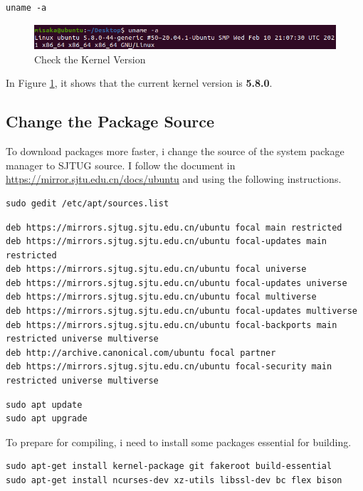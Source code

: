 \documentclass[UTF8,10pt,a4paper]{article}
\theoremstyle{Problem}
\theoremstyle{Solution}
\begin{document}
\begin{lstlisting}
uname -a
\end{lstlisting}

\begin{figure}[H]
    \centering
    \includegraphics[width=380pt]{3.png}
    \caption{Check the Kernel Version}
    \label{3}
\end{figure}

In Figure \ref{3}, it shows that the current kernel version is \textbf{5.8.0}.

\subsection{Change the Package Source}
To download packages more faster, i change the source of the system package manager to SJTUG source. I follow the document in \underline{https://mirror.sjtu.edu.cn/docs/ubuntu} and using the following instructions.

\begin{lstlisting}
sudo gedit /etc/apt/sources.list
\end{lstlisting}

\begin{lstlisting}
deb https://mirrors.sjtug.sjtu.edu.cn/ubuntu focal main restricted
deb https://mirrors.sjtug.sjtu.edu.cn/ubuntu focal-updates main restricted
deb https://mirrors.sjtug.sjtu.edu.cn/ubuntu focal universe
deb https://mirrors.sjtug.sjtu.edu.cn/ubuntu focal-updates universe
deb https://mirrors.sjtug.sjtu.edu.cn/ubuntu focal multiverse
deb https://mirrors.sjtug.sjtu.edu.cn/ubuntu focal-updates multiverse
deb https://mirrors.sjtug.sjtu.edu.cn/ubuntu focal-backports main restricted universe multiverse
deb http://archive.canonical.com/ubuntu focal partner
deb https://mirrors.sjtug.sjtu.edu.cn/ubuntu focal-security main restricted universe multiverse
\end{lstlisting}

\begin{lstlisting}
sudo apt update
sudo apt upgrade
\end{lstlisting}

To prepare for compiling, i need to install some packages essential for building.

\begin{lstlisting}
sudo apt-get install kernel-package git fakeroot build-essential
sudo apt-get install ncurses-dev xz-utils libssl-dev bc flex bison
\end{lstlisting}
\end{document}
